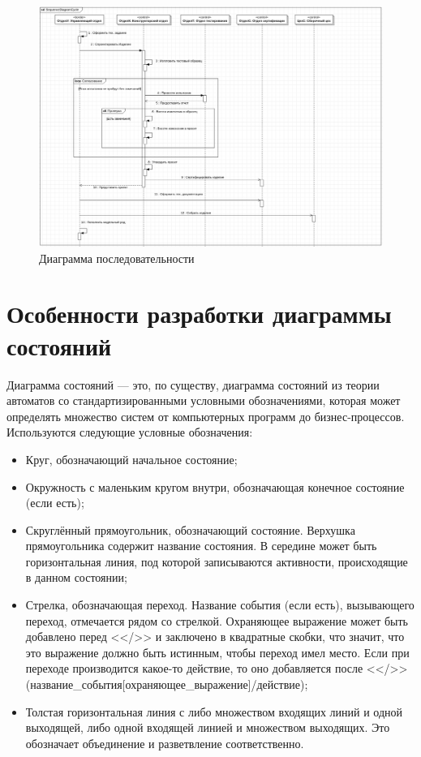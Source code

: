 \documentclass[a4paper,12pt]{report}
\begin{document}
\begin{figure}[h!]
	\centering
	\includegraphics[width=1\linewidth]{images/sequence}
	\caption{Диаграмма последовательности}
	\label{fig:sequence}
\end{figure}
\newpage
\section{Особенности разработки диаграммы состояний}
Диаграмма состояний --- это, по существу, диаграмма состояний из теории автоматов со стандартизированными условными обозначениями, которая может определять множество систем от компьютерных программ до бизнес-процессов. Используются следующие условные обозначения:
\begin{itemize}
	\item Круг, обозначающий начальное состояние;
	\item Окружность с маленьким кругом внутри, обозначающая конечное состояние (если есть);
	\item Скруглённый прямоугольник, обозначающий состояние. Верхушка прямоугольника содержит название состояния. В середине может быть горизонтальная линия, под которой записываются активности, происходящие в данном состоянии;
	\item Стрелка, обозначающая переход. Название события (если есть), вызывающего переход, отмечается рядом со стрелкой. Охраняющее выражение может быть добавлено перед <</>> и заключено в квадратные скобки, что значит, что это выражение должно быть истинным, чтобы переход имел место. Если при переходе производится какое-то действие, то оно добавляется после <</>> (название\_события[охраняющее\_выражение]/действие);
	\item Толстая горизонтальная линия с либо множеством входящих линий и одной выходящей, либо одной входящей линией и множеством выходящих. Это обозначает объединение и разветвление соответственно.
\end{itemize}
\end{document}
